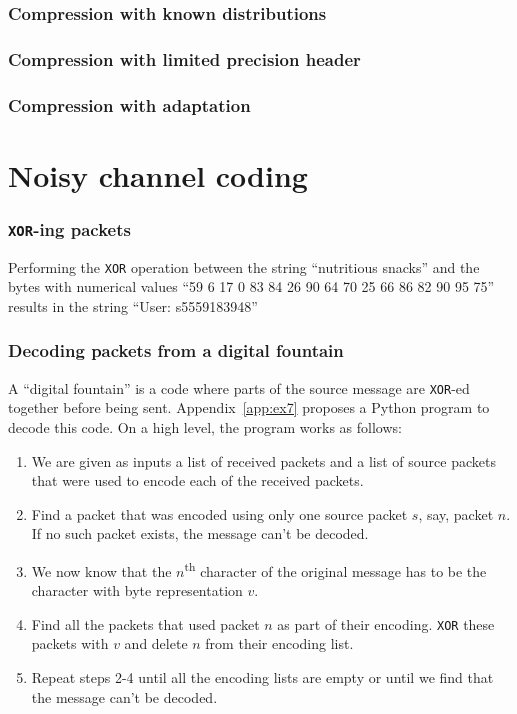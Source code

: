 \documentclass[10pt,a4paper,oneside,onecolumn]{article}
\newcommand*{\XOR}{{\tt XOR}\xspace}
\begin{document}
\section{Compression with known distributions}\label{sec:ex3}
\section{Compression with limited precision header}\label{sec:ex4}
\section{Compression with adaptation}\label{sec:ex5}


\part{Noisy channel coding}

\section{\XOR-ing packets}\label{sec:ex6}

Performing the \XOR operation between the string ``nutritious snacks'' and the
bytes with numerical values ``59 6 17 0 83 84 26 90 64 70 25 66 86 82 90 95 75''
results in the string ``User: s5559183948''

\section{Decoding packets from a digital fountain}\label{sec:ex7}

A ``digital fountain'' is a code where parts of the source message are \XOR-ed
together before being sent. Appendix~\ref{app:ex7} proposes a Python program to
decode this code. On a high level, the program works as follows:

\begin{enumerate}
\item We are given as inputs a list of received packets and a list of source
      packets that were used to encode each of the received packets.
\item Find a packet that was encoded using only one source packet $s$, say,
      packet $n$.  If no such packet exists, the message can't be decoded.
\item We now know that the $n$\textsuperscript{th} character of the original
      message has to be the character with byte representation $v$.
\item Find all the packets that used packet $n$ as part of their encoding.
      \XOR these packets with $v$ and delete $n$ from their encoding list.
\item Repeat steps 2-4 until all the encoding lists are empty or until we find
      that the message can't be decoded.
\end{enumerate}
\end{document}
